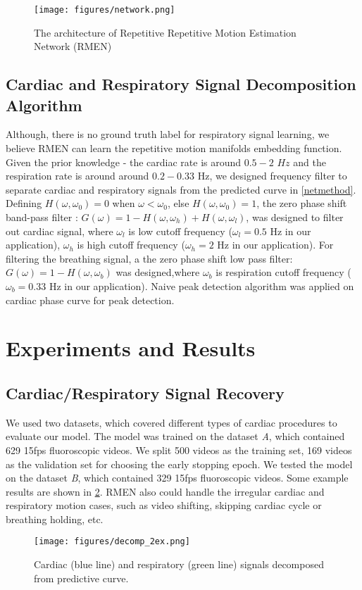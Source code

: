 \documentclass{article}
\begin{document}
\begin{figure}[htpb]
	\centering
    \texttt{[image: figures/network.png]}
    \caption{The architecture of Repetitive Repetitive Motion Estimation Network (RMEN) }
    \label{network}   
\end{figure}
\subsection{Cardiac and Respiratory Signal Decomposition Algorithm}
Although, there is no ground truth label for respiratory signal learning, we believe RMEN can learn the repetitive motion manifolds embedding function. Given the prior knowledge - the cardiac rate is around $0.5 - 2$ $Hz$ and the respiration rate is around around $0.2 - 0.33$ Hz, we designed frequency filter to separate cardiac and respiratory signals from the predicted curve in \ref{netmethod}. Defining $H(\omega,\omega_0) = 0$ when $\omega < \omega_0$, else $H(\omega,\omega_0) = 1$, the zero phase shift band-pass filter : $G(\omega) =1-H(\omega,\omega_h) + H(\omega,\omega_l)$, was designed to filter out cardiac signal, where $\omega_l$ is low cutoff frequency ($\omega_l = 0.5$ Hz in our application), $\omega_h$ is high cutoff frequency ($\omega_h = 2$ Hz in our application). For filtering the breathing signal, a the zero phase shift low pass filter: $G(\omega) = 1 - H(\omega,\omega_b)$  was designed,where $\omega_b$ is respiration cutoff frequency ($\omega_b = 0.33$ Hz in our application). Naive peak detection algorithm \cite{findpeak} was applied on cardiac phase curve for peak detection.

\section{Experiments and Results}
\subsection{Cardiac/Respiratory Signal Recovery}
We used two datasets, which covered different types of cardiac procedures to evaluate our model. The model was trained on the dataset \textit{A}, which contained 629 15fps fluoroscopic videos. We split 500 videos as the training set, 169 videos as the validation set for choosing the early stopping epoch. We tested the model on the dataset \textit{B}, which contained 329 15fps fluoroscopic videos.  Some example results are shown in \ref{signal}. RMEN also could handle the irregular cardiac and respiratory motion cases, such as video shifting, skipping cardiac cycle or breathing holding, etc.
\begin{figure}[htpb]
	\centering
    \texttt{[image: figures/decomp\_2ex.png]}
    \caption{Cardiac (blue line) and respiratory (green line) signals decomposed from predictive curve. }
    \label{signal}   
\end{figure}
\end{document}
